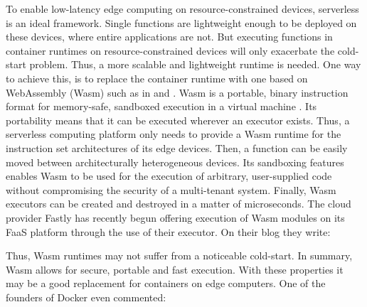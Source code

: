 To enable low-latency edge computing on resource-constrained devices, serverless is an ideal framework. Single functions are lightweight enough to be deployed on these devices, where entire applications are not. But executing functions in container runtimes on resource-constrained devices will only exacerbate the cold-start problem. Thus, a more scalable and lightweight runtime is needed. One way to achieve this, is to replace the container runtime with one based on WebAssembly (Wasm) such as in \cite{Hall2019} and \cite{Murphy2020}. Wasm is a portable, binary instruction format for memory-safe, sandboxed execution in a virtual machine \cite{W3C2020}. Its portability means that it can be executed wherever an executor exists. Thus, a serverless computing platform only needs to provide a Wasm runtime for the instruction set architectures of its edge devices. Then, a function can be easily moved between architecturally heterogeneous devices. Its sandboxing features enables Wasm to be used for the execution of arbitrary, user-supplied code without compromising the security of a multi-tenant system. Finally, Wasm executors can be created and destroyed in a matter of microseconds. The cloud provider Fastly has recently begun offering execution of Wasm modules on its FaaS platform through the use of their  executor. On their blog they write:

\begin{quote}
   \cite{fastly2019}
\end{quote}

Thus, Wasm runtimes may not suffer from a noticeable cold-start.
In summary, Wasm allows for secure, portable and fast execution. With these properties it may be a good replacement for containers on edge computers. One of the founders of Docker even commented:

\begin{quote}
   \cite{Hykes2019}
\end{quote}

